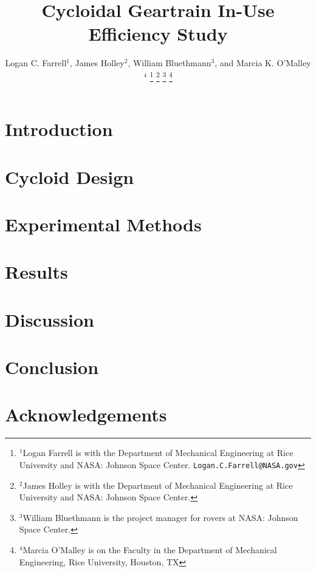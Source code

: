 \documentclass[letterpaper, 10 pt, conference]{ieeeconf}  %
\title{\LARGE \bf
Cycloidal Geartrain In-Use Efficiency Study
}
\author{Logan C. Farrell$^{1}$, James Holley$^{2}$, William Bluethmann$^{3}$, and Marcia K. O'Malley$^{4}$%
\thanks{$^{1}$Logan Farrell is with the Department of Mechanical Engineering at Rice University and NASA: Johnson Space Center.
		{\tt\small Logan.C.Farrell@NASA.gov}}%
\thanks{$^{2}$James Holley is with the Department of Mechanical Engineering at Rice University and NASA: Johnson Space Center.}%
\thanks{$^{3}$William Bluethmann is the project manager for rovers at NASA: Johnson Space Center.}%
\thanks{$^{4}$Marcia O'Malley is on the Faculty in the Department of Mechanical Engineering, Rice University, Houston, TX}%
}
\begin{document}
\maketitle
\thispagestyle{empty}
\pagestyle{empty}

\begin{abstract}

\end{abstract}

\section{Introduction}
\label{intro}


\section{Cycloid Design}
\label{design}


\section{Experimental Methods}
\label{methods}


\section{Results}
\label{results}


\section{Discussion}
\label{discussion}


\section{Conclusion}
\label{conclusion}


\section{Acknowledgements}
\label{acknowledgements}




\end{document}

